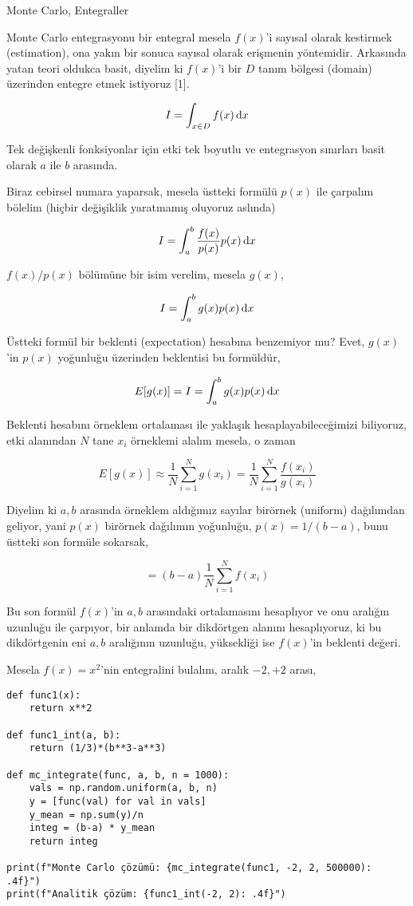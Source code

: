 \documentclass[12pt,fleqn]{article}\usepackage{../../common}
\begin{document}
Monte Carlo, Entegraller

Monte Carlo entegrasyonu bir entegral mesela $f(x)$'i sayısal olarak kestirmek
(estimation), ona yakın bir sonuca sayısal olarak erişmenin
yöntemidir. Arkasında yatan teori oldukca basit, diyelim ki $f(x)$'i bir $D$
tanım bölgesi (domain) üzerinden entegre etmek istiyoruz [1].

$$
I = \int_{x \in D} f(x) \,\mathrm{d} x
$$

Tek değişkenli fonksiyonlar için etki tek boyutlu ve entegrasyon sınırları
basit olarak $a$ ile $b$ arasında.

Biraz cebirsel numara yaparsak, mesela üstteki formülü $p(x)$ ile çarpalım
bölelim (hiçbir değişiklik yaratmamış oluyoruz aslında)

$$
I = \int_{a}^{b} \frac{f(x)}{p(x)} p(x) \,\mathrm{d} x
$$

$f(x)/p(x)$ bölümüne bir isim verelim, mesela $g(x)$,

$$
I = \int_{a}^{b} g(x) p(x) \,\mathrm{d} x
$$

Üstteki formül bir beklenti (expectation) hesabına benzemiyor mu? Evet,
$g(x)$'in $p(x)$ yoğunluğu üzerinden beklentisi bu formüldür, 

$$
E[g(x)] = I = \int_{a}^{b} g(x) p(x) \,\mathrm{d} x
$$

Beklenti hesabını örneklem ortalaması ile yaklaşık hesaplayabileceğimizi
biliyoruz, etki alanından $N$ tane $x_i$ örneklemi alalım mesela, o zaman

$$
E[g(x)] \approx
\frac{1}{N} \sum_{i=1}^{N} g(x_i) =
\frac{1}{N} \sum_{i=1}^{N} \frac{f(x_i)}{g(x_i)}
$$

Diyelim ki $a,b$ arasında örneklem aldığımız sayılar birörnek (uniform)
dağılımdan geliyor, yani $p(x)$ birörnek dağılımın yoğunluğu, $p(x) = 1/(b-a)$,
bunu üstteki son formüle sokarsak,

$$
= (b-a) \frac{1}{N} \sum_{i=1}^{N} f(x_i) 
$$

Bu son formül $f(x)$'in $a,b$ arasındaki ortalamasını hesaplıyor ve onu aralığın
uzunluğu ile çarpıyor, bir anlamda bir dikdörtgen alanını hesaplıyoruz,
ki bu dikdörtgenin eni $a,b$ aralığının uzunluğu, yüksekliği ise $f(x)$'in
beklenti değeri.

Mesela $f(x) = x^2$'nin entegralini bulalım, aralık $-2,+2$ arası,

\begin{verbatim}
def func1(x):
    return x**2

def func1_int(a, b):
    return (1/3)*(b**3-a**3)
  
def mc_integrate(func, a, b, n = 1000):
    vals = np.random.uniform(a, b, n)
    y = [func(val) for val in vals]    
    y_mean = np.sum(y)/n
    integ = (b-a) * y_mean    
    return integ

print(f"Monte Carlo çözümü: {mc_integrate(func1, -2, 2, 500000): .4f}")
print(f"Analitik çözüm: {func1_int(-2, 2): .4f}")
\end{verbatim}
\end{document}
